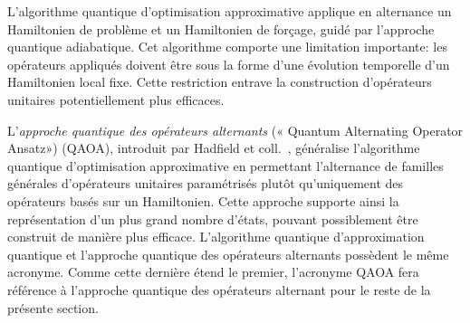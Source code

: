 L'algorithme quantique d'optimisation approximative applique en alternance un Hamiltonien de problème et un Hamiltonien de forçage, guidé par l'approche quantique adiabatique. Cet algorithme comporte une limitation importante: les opérateurs appliqués doivent être sous la forme d'une évolution temporelle d'un Hamiltonien local fixe. Cette restriction entrave la construction d'opérateurs unitaires potentiellement plus efficaces.

L'\textit{approche quantique des opérateurs alternants} (« Quantum Alternating Operator Ansatz») (QAOA), introduit par Hadfield et coll.~\cite{hadfieldQuantumApproximateOptimization2019}, généralise l'algorithme quantique d'optimisation approximative en permettant l'alternance de familles générales d'opérateurs unitaires paramétrisés plutôt qu'uniquement des opérateurs basés sur un Hamiltonien. Cette approche supporte ainsi la représentation d'un plus grand nombre d'états, pouvant possiblement être construit de manière plus efficace. L'algorithme quantique d'approximation quantique et l'approche quantique des opérateurs alternants possèdent le même acronyme. Comme cette dernière étend le premier, l'acronyme QAOA fera référence à l'approche quantique des opérateurs alternant pour le reste de la présente section.

